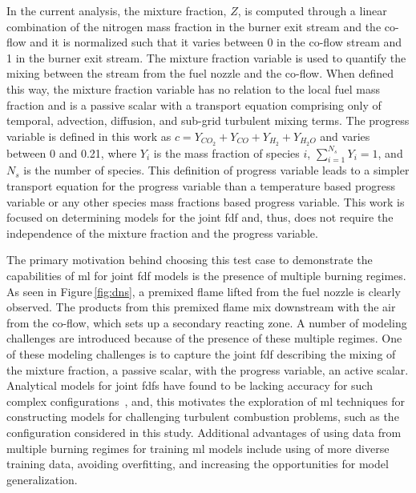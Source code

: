 \documentclass[review]{elsarticle}
\begin{document}
In the current analysis, the mixture fraction, $Z$, is computed
through a linear combination of the nitrogen mass fraction in the
burner exit stream and the co-flow and it is normalized such that it
varies between 0 in the co-flow stream and 1 in the burner exit
stream. The mixture fraction variable is used to quantify the mixing
between the stream from the fuel nozzle and the co-flow. When defined
this way, the mixture fraction variable has no relation to the local
fuel mass fraction and is a passive scalar with a transport equation
comprising only of temporal, advection, diffusion, and sub-grid
turbulent mixing terms. The progress variable is defined in this work
as $c= Y_{CO_2} + Y_{CO} + Y_{H_2} + Y_{H_2O}$ and varies between 0
and 0.21, where $Y_i$ is the mass fraction of species $i$,
$\sum^{N_s}_{i=1} Y_i = 1$, and $N_s$ is the number of species. This
definition of progress variable leads to a simpler transport equation
for the progress variable than a temperature based progress variable
or any other species mass fractions based progress variable. This work
is focused on determining models for the joint \gls{fdf} and, thus,
does not require the independence of the mixture fraction and the
progress variable.

The primary motivation behind choosing this test case to demonstrate
the capabilities of \gls{ml} for joint \gls{fdf} models is the
presence of multiple burning regimes. As seen in
Figure\,\ref{fig:dns}, a premixed flame lifted from the fuel nozzle is
clearly observed. The products from this premixed flame mix downstream
with the air from the co-flow, which sets up a secondary reacting
zone. A number of modeling challenges are introduced because of the
presence of these multiple regimes. One of these modeling challenges
is to capture the joint \gls{fdf} describing the mixing of the mixture
fraction, a passive scalar, with the progress variable, an active
scalar. Analytical models for joint \glspl{fdf} have found to be
lacking accuracy for such complex configurations~\cite{Ihme2008}, and,
this motivates the exploration of \gls{ml} techniques for constructing
models for challenging turbulent combustion problems, such as the
configuration considered in this study. Additional advantages of using
data from multiple burning regimes for training \gls{ml} models include
using of more diverse training data, avoiding overfitting, and
increasing the opportunities for model generalization.
\end{document}
